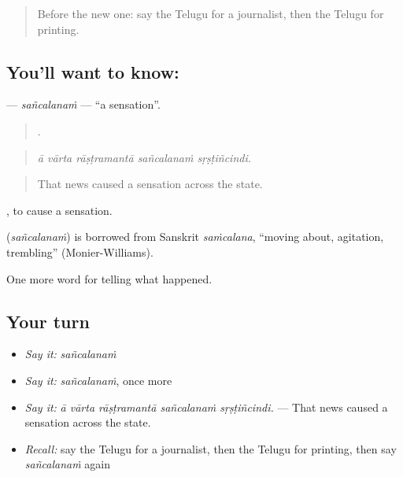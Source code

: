 \label{lesson:TE-C375-sancalanam}



\begin{quote}
Before the new one: say the Telugu for a journalist, then the Telugu for printing.
\end{quote}

\subsection*{You'll want to know: }
\textbf{} — \emph{sañcalanaṁ} — \textquotedblleft{}a sensation\textquotedblright{}.

\begin{quote}
    .
\end{quote}

\begin{quote}
\emph{ā vārta rāṣṭramantā sañcalanaṁ sṛṣṭiñcindi.}
\end{quote}

\begin{quote}
That news caused a sensation across the state.
\end{quote}

 , to cause a sensation.

\begin{cousinweb}
\textbf{} (\emph{sañcalanaṁ}) is borrowed from Sanskrit \emph{saṁcalana}, \textquotedblleft{}moving about, agitation, trembling\textquotedblright{} (Monier-Williams).
\end{cousinweb}

\begin{grammarlens}[title={What you've built}]
One more word for telling what happened.
\end{grammarlens}

\subsection*{Your turn}
\begin{itemize}
\raggedright
  \item \emph{Say it:} \emph{sañcalanaṁ}
  \item \emph{Say it:} \emph{sañcalanaṁ}, once more
  \item \emph{Say it:} \emph{ā vārta rāṣṭramantā sañcalanaṁ sṛṣṭiñcindi.} — That news caused a sensation across the state.
  \item \emph{Recall:} say the Telugu for a journalist, then the Telugu for printing, then say \emph{sañcalanaṁ} again
\end{itemize}

